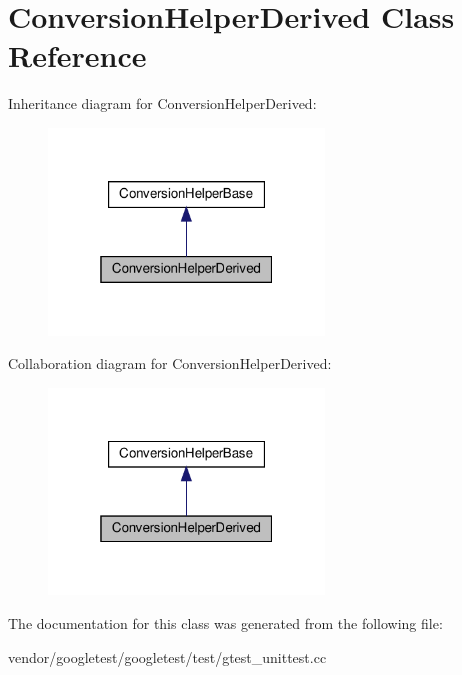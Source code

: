 \hypertarget{class_conversion_helper_derived}{}\section{Conversion\+Helper\+Derived Class Reference}
\label{class_conversion_helper_derived}


Inheritance diagram for Conversion\+Helper\+Derived\+:
\nopagebreak
\begin{figure}[H]
\begin{center}
\leavevmode
\includegraphics[width=208pt]{class_conversion_helper_derived__inherit__graph}
\end{center}
\end{figure}


Collaboration diagram for Conversion\+Helper\+Derived\+:
\nopagebreak
\begin{figure}[H]
\begin{center}
\leavevmode
\includegraphics[width=208pt]{class_conversion_helper_derived__coll__graph}
\end{center}
\end{figure}


The documentation for this class was generated from the following file\+:\begin{DoxyCompactItemize}
\item 
vendor/googletest/googletest/test/gtest\+\_\+unittest.\+cc\end{DoxyCompactItemize}
